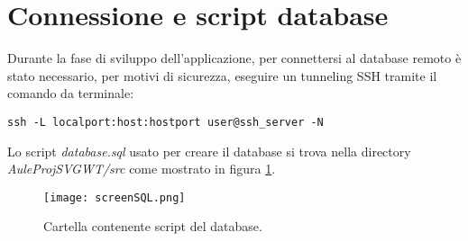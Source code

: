 \section*{Connessione e script database}
Durante la fase di sviluppo dell'applicazione, per connettersi al database remoto è stato necessario, per motivi di sicurezza, eseguire un tunneling SSH tramite il comando da terminale: 
\begin{lstlisting}
ssh -L localport:host:hostport user@ssh_server -N 
\end{lstlisting}
Lo script \emph{database.sql} usato per creare il database si trova nella directory \emph{AuleProjSVGWT/src} come mostrato in figura \ref{fig:dbSQL}.

\begin{figure}[!htb]
\centering%
\texttt{[image: screenSQL.png]}%
\caption{Cartella contenente script del database.}\label{fig:dbSQL}%
\end{figure}
\FloatBarrier
